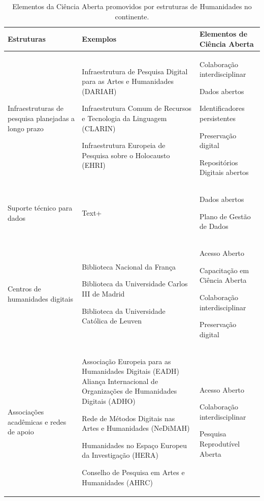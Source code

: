 \documentclass[portuguese]{textolivre}
\begin{document}
\begin{table}[h!]
\centering
\begin{threeparttable}
\caption{Elementos da Ciência Aberta promovidos por estruturas de Humanidades no continente.}
\label{tab02}
\begin{tabular}{>{\raggedright\arraybackslash}p{3cm} >{\raggedright\arraybackslash}p{5.2cm} >{\raggedright\arraybackslash}p{5.2cm}}
\toprule
Estruturas & Exemplos & Elementos de Ciência Aberta \\
\midrule
Infraestruturas de pesquisa planejadas a longo prazo & Infraestrutura de Pesquisa Digital para as Artes e Humanidades (DARIAH)

Infraestrutura Comum de Recursos e Tecnologia da Linguagem (CLARIN)

Infraestrutura Europeia de Pesquisa sobre o Holocausto (EHRI) & Colaboração interdisciplinar

Dados abertos

Identificadores persistentes

Preservação digital

Repositórios Digitais abertos \\
Suporte técnico para dados & Text+ & 
Dados abertos

Plano de Gestão de Dados \\
Centros de humanidades digitais & Biblioteca Nacional da França

Biblioteca da Universidade Carlos III de Madrid

Biblioteca da Universidade Católica de Leuven & Acesso Aberto

Capacitação em Ciência Aberta

Colaboração interdisciplinar

Preservação digital \\
Associações acadêmicas e redes de apoio & Associação Europeia para as Humanidades Digitais (EADH)
Aliança Internacional de Organizações de Humanidades Digitais (ADHO)

Rede de Métodos Digitais nas Artes e Humanidades (NeDiMAH)

Humanidades no Espaço Europeu da Investigação (HERA)

Conselho de Pesquisa em Artes e Humanidades (AHRC) & Acesso Aberto

Colaboração interdisciplinar

Pesquisa Reprodutível Aberta \\
\bottomrule
\end{tabular}
\end{threeparttable}
\end{table}
\end{document}
